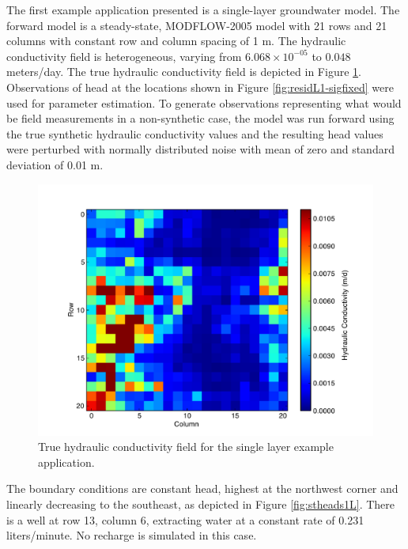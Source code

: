 \documentclass[11pt,oneside,onecolumn]{usgsreport}
\begin{document}
\begin{appendix}

The first example application presented is a single-layer groundwater
model. The forward model is a steady-state, MODFLOW-2005 model with
21 rows and 21 columns with constant row and column spacing of 1 m.
The hydraulic conductivity field is heterogeneous, varying from $6.068\times10^{-05}$
to $0.048$ meters/day. The true hydraulic conductivity field is depicted
in Figure \ref{fig:trueK1L}. Observations of head at the locations
shown in Figure \ref{fig:residL1-sigfixed} were used for parameter
estimation. To generate observations representing what would be field
measurements in a non-synthetic case, the model was run forward using
the true synthetic hydraulic conductivity values and the resulting
head values were perturbed with normally distributed noise with mean
of zero and standard deviation of 0.01 m.

\begin{figure}[H]
\begin{center}\includegraphics[scale=0.4]{figures/TrueK}\end{center}

\caption{True hydraulic conductivity field for the single layer example application.\label{fig:trueK1L}}


\end{figure}
The boundary conditions are constant head, highest at the northwest
corner and linearly decreasing to the southeast, as depicted in Figure
\ref{fig:stheads1L}. There is a well at row 13, column 6, extracting
water at a constant rate of 0.231 liters/minute. No recharge is simulated
in this case.


\end{appendix}
\end{document}
